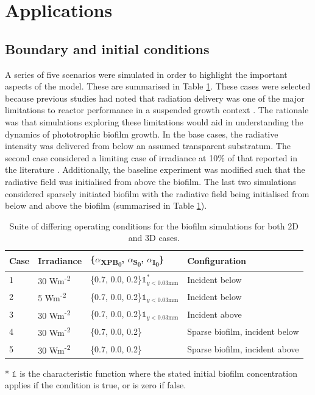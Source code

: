 \section{Applications}
\subsection{Boundary and initial conditions}
A series of five scenarios were simulated in order to highlight the important aspects of the model. These are summarised in Table \ref{tab:biofilm_cases}. These cases were selected because previous studies had noted that radiation delivery was one of the major limitations to reactor performance in a suspended growth context \cite{hulsen2016, hulsen2016a}. The rationale was that simulations exploring these limitations would aid in understanding the dynamics of phototrophic biofilm growth. In the base cases, the radiative intensity was delivered from below an assumed transparent substratum. The second case considered a limiting case of irradiance at 10\% of that reported in the literature \cite{hulsen2018}. Additionally, the baseline experiment was modified such that the radiative field was initialised from above the biofilm. The last two simulations considered sparsely initiated biofilm with the radiative field being initialised from below and above the biofilm (summarised in Table \ref{tab:biofilm_cases}). 

\begin{table}[H]
    \centering
    \small
    \renewcommand{\arraystretch}{1.4}
    \caption{Suite of differing operating conditions for the biofilm simulations for both 2D and 3D cases.}
    \tabcolsep=0.11cm
    \begin{tabular}{@{}p{2cm} p{4cm} p{5cm} p{5.5cm}@{}} \toprule
Case & Irradiance  &  \{$\alpha$\textsubscript{XPB\textsubscript{0}}, $\alpha$\textsubscript{S\textsubscript{0}}, $\alpha$\textsubscript{I\textsubscript{0}}\}  &  Configuration \\ \hline
1    &  30 Wm\textsuperscript{-2}   &  \{0.7, 0.0, 0.2\}$\mathbb{1}^*_{y<0.03\mathrm{mm}}$  & Incident below\\
2    &  5 Wm\textsuperscript{-2}  &    \{0.7, 0.0, 0.2\}$\mathbb{1}_{y<0.03\mathrm{mm}}$  & Incident below\\
3    &  30 Wm\textsuperscript{-2}  &   \{0.7, 0.0, 0.2\}$\mathbb{1}_{y<0.03\mathrm{mm}}$  & Incident above\\
4    &  30 Wm\textsuperscript{-2}  &   \{0.7, 0.0, 0.2\}  & Sparse biofilm, incident below\\
5    &  30 Wm\textsuperscript{-2}  &   \{0.7, 0.0, 0.2\}  & Sparse biofilm, incident above\\ \hline
    \end{tabular}
  \scriptsize{* $\mathbb{1}$ is the characteristic function where the stated initial biofilm concentration applies if the condition is true, or is zero if false.} 
    \label{tab:biofilm_cases}
\end{table}

